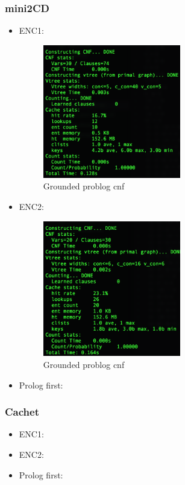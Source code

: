 \documentclass[a4paper,10pt]{report}
\begin{document}
\subsubsection*{mini2CD}

\begin{itemize}
	\item ENC1:
\begin{figure}[h!]
  \includegraphics[width=6cm]{minic2d-ENC1.png}
  \caption{Grounded problog cnf}
\end{figure}
	\item ENC2:
	\begin{figure}[h!]
  \includegraphics[width=6cm]{minic2d-ENC2.png}
  \caption{Grounded problog cnf}
\end{figure}

	\item Prolog first:
\end{itemize}

\subsubsection*{Cachet}

\begin{itemize}
	\item ENC1:
	\item ENC2:
	\item Prolog first:
\end{itemize}
\end{document}
